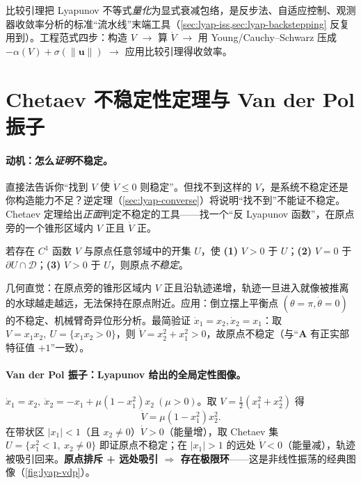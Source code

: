 \noindent 比较引理把 Lyapunov 不等式\emph{量化}为显式衰减包络，是反步法、自适应控制、观测器收敛率分析的标准“流水线”末端工具（\cref{sec:lyap-iss,sec:lyap-backstepping} 反复用到）。工程范式四步：构造 $V$ $\to$ 算 $\dot V$ $\to$ 用 Young/Cauchy–Schwarz 压成 $-\alpha(V)+\sigma(\|\mathbf{u}\|)$ $\to$ 应用比较引理得收敛率。

\section{Chetaev 不稳定性定理与 Van der Pol 振子}
\label{sec:lyap-chetaev}

\paragraph{动机：怎么\emph{证明}不稳定。}
直接法告诉你“找到 $V$ 使 $\dot V\le0$ 则稳定”。但找不到这样的 $V$，是系统不稳定还是你构造能力不足？逆定理（\cref{sec:lyap-converse}）将说明“找不到”不能证不稳定。Chetaev 定理给出\emph{正面}判定不稳定的工具——找一个“反 Lyapunov 函数”，在原点旁的一个锥形区域内 $V$ 正且 $\dot V$ 正。

\begin{theorem}
\label{thm:lyap-chetaev}
若存在 $C^1$ 函数 $V$ 与原点任意邻域中的开集 $U$，使 \textbf{(1)} $V>0$ 于 $U$；\textbf{(2)} $V=0$ 于 $\partial U\cap\mathcal{D}$；\textbf{(3)} $\dot V>0$ 于 $U$，则原点\emph{不稳定}。
\end{theorem}

\noindent 几何直觉：在原点旁的锥形区域内 $V$ 正且沿轨迹递增，轨迹一旦进入就像被推离的水球越走越远，无法保持在原点附近。应用：倒立摆上平衡点 $(\theta=\pi,\dot\theta=0)$ 的不稳定、机械臂奇异位形分析。最简验证 $\dot x_1=x_2,\dot x_2=x_1$：取 $V=x_1x_2,\ U=\{x_1x_2>0\}$，则 $\dot V=x_2^2+x_1^2>0$，故原点不稳定（与“$\mathbf{A}$ 有正实部特征值 $+1$”一致）。

\paragraph{Van der Pol 振子：Lyapunov 给出的全局定性图像。}
$\dot x_1=x_2,\ \dot x_2=-x_1+\mu(1-x_1^2)x_2\ (\mu>0)$。取 $V=\tfrac12(x_1^2+x_2^2)$ 得
\begin{equation}
  \dot V=\mu(1-x_1^2)x_2^2.
  \label{eq:lyap-vdp-vdot}
\end{equation}
在带状区 $|x_1|<1$（且 $x_2\neq0$）$\dot V>0$（能量增），取 Chetaev 集 $U=\{x_1^2<1,\ x_2\neq0\}$ 即证原点不稳定；在 $|x_1|>1$ 的远处 $\dot V<0$（能量减），轨迹被吸引回来。\textbf{原点排斥 + 远处吸引 $\Rightarrow$ 存在极限环}——这是非线性振荡的经典图像（\cref{fig:lyap-vdp}）。

